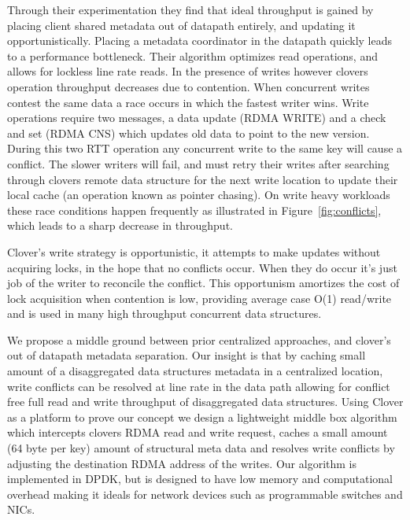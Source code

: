 Through their experimentation they find that ideal throughput is
gained by placing client shared metadata out of datapath entirely, and
updating it opportunistically. Placing a metadata coordinator in the
datapath quickly leads to a performance bottleneck. Their algorithm
optimizes read operations, and allows for lockless line rate reads. In
the presence of writes however clovers operation throughput decreases
due to contention. When concurrent writes contest the same data a race
occurs in which the fastest writer wins. Write operations require two
messages, a data update (RDMA WRITE) and a check and set (RDMA CNS)
which updates old data to point to the new version. During this two
RTT operation any concurrent write to the same key will cause a
conflict. The slower writers will fail, and must retry their writes
after searching through clovers remote data structure for the next
write location to update their local cache (an operation known as
pointer chasing). On write heavy workloads these race conditions
happen frequently as illustrated in Figure~\ref{fig:conflicts}, which
leads to a sharp decrease in throughput.



Clover's write strategy is opportunistic, it attempts to make updates
without acquiring locks, in the hope that no conflicts occur. When
they do occur it's just job of the writer to reconcile the conflict.
This opportunism amortizes the cost of lock acquisition when
contention is low, providing average case O(1) read/write and is used
in many high throughput concurrent data structures.

We propose a middle ground between prior centralized approaches, and
clover's out of datapath metadata separation. Our insight is that by
caching small amount of a disaggregated data structures metadata in a
centralized location, write conflicts can be resolved at line rate in
the data path allowing for conflict free full read and write
throughput of disaggregated data structures. Using Clover as a
platform to prove our concept we design a lightweight middle box
algorithm which intercepts clovers RDMA read and write request, caches
a small amount (64 byte per key) amount of structural meta data and
resolves write conflicts by adjusting the destination RDMA address of
the writes. Our algorithm is implemented in DPDK, but is designed to
have low memory and computational overhead making it ideals for
network devices such as programmable switches and NICs.




